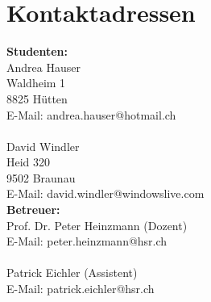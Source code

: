 \documentclass[12pt, a4paper]{report}
\begin{document}
	\chapter{Kontaktadressen}
	\label{LastPage}
	\begin{multicols}{2}
	\noindent \textbf{Studenten:}
	\\
	Andrea Hauser\\
	Waldheim 1\\
	8825 Hütten\\
	E-Mail: andrea.hauser@hotmail.ch\\
	\\
	David Windler\\
	Heid 320\\
	9502 Braunau\\
	\columnbreak
	E-Mail: david.windler@windowslive.com\\
	\textbf{Betreuer:}\\
	Prof. Dr. Peter Heinzmann (Dozent)\\
	E-Mail: peter.heinzmann@hsr.ch\\
	\\
	Patrick Eichler (Assistent)\\
	E-Mail: patrick.eichler@hsr.ch\\
	
	\end{multicols}
	
	

	
	
	
\end{document}
